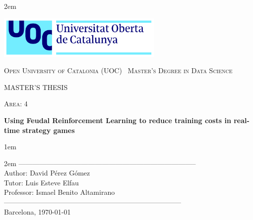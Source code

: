 \newpage
\thispagestyle{empty}

\baselineskip 2em


\centerline{\includegraphics[width=0.6\textwidth]{images/UOC-logo}}
\begin{center}
\textsc{Open University of Catalonia (UOC) \
Master's Degree in Data Science \
}


\vspace*{1.5cm}

\textsc{\Large MASTER'S THESIS}

\vspace*{0.5cm}

\textsc{\large Area: 4}


\vspace*{2.0cm}

\textbf{\Large Using Feudal Reinforcement Learning to reduce training costs in real-time strategy games}


\vspace{2.5cm}
\baselineskip 1em

\baselineskip 2em
-----------------------------------------------------------------------------\\
Author: David Pérez Gómez\\
Tutor: Luis Esteve Elfau\\
Professor: Ismael Benito Altamirano\\
-----------------------------------------------------------------------------\\
\vspace*{1.5cm}
Barcelona, \today

\end{center}

\newpage
\pagestyle{empty}
\hfill